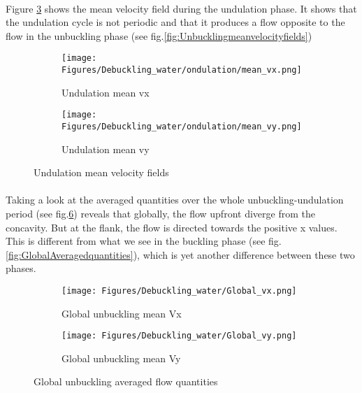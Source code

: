 \documentclass[a4paper,10pt]{report}
\begin{document}
\paragraph{}
Figure \ref{fig:Undulationmeanvelocityfields} shows the mean velocity field during the undulation phase. It shows that the undulation cycle is not periodic and that it produces a flow opposite to the flow in the unbuckling phase (see fig.\ref{fig:Unbucklingmeanvelocityfields})


\begin{figure}[htbp]%
	\centering%
	 \begin{subfigure}[h]{0.5\textwidth}%
        \texttt{[image: Figures/Debuckling\_water/ondulation/mean\_vx.png]}%
        \caption{Undulation mean vx}%
				\label{fig:UnbucklingVelocityField}%
    \end{subfigure}%
    \begin{subfigure}[h]{0.5\textwidth}%
        \texttt{[image: Figures/Debuckling\_water/ondulation/mean\_vy.png]}%
        \caption{Undulation mean vy}%
        \label{fig:Unbucklingstreamlines}%
    \end{subfigure}%
		\caption{Undulation mean velocity fields}%
		\label{fig:Undulationmeanvelocityfields}%
\end{figure}

\paragraph{}
Taking a look at the averaged quantities over the whole unbuckling-undulation period (see fig.\ref{fig:GlobalUnbucklingAveragedquantities})  reveals that globally, the flow upfront diverge from the concavity. But at the flank, the flow is directed towards the positive x values. This is different from what we see in the buckling phase (see fig.\ref{fig:GlobalAveragedquantities}), which is yet another difference between these two phases.

\begin{figure}[htbp]%
	\centering%
	 \begin{subfigure}[t]{0.5\textwidth}%
        \texttt{[image: Figures/Debuckling\_water/Global\_vx.png]}%
        \caption{Global unbuckling mean Vx}%
				\label{fig:GlobalVx}%
    \end{subfigure}%
    \begin{subfigure}[t]{0.5\textwidth}%
        \texttt{[image: Figures/Debuckling\_water/Global\_vy.png]}%
        \caption{Global unbuckling mean Vy}%
        \label{fig:GlobalVy}%
    \end{subfigure}%
		\caption{Global unbuckling averaged flow quantities}%
		\label{fig:GlobalUnbucklingAveragedquantities}%
\end{figure}
\end{document}
